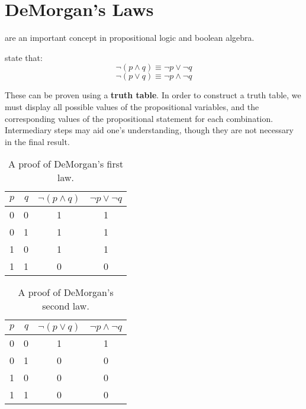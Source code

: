 \section{DeMorgan's Laws}
 are an important concept in propositional
logic and boolean algebra.

\begin{defn}
 state that:
\begin{equation}
  \neg (p \land q) \equiv \neg p \lor \neg q
\end{equation}
\begin{equation}
  \neg(p \lor q) \equiv \neg p \land \neg q
\end{equation}
\end{defn}
These can be proven using a \textbf{truth table}.
In order to construct a truth table, we must display all possible values of the propositional variables,
and the corresponding values of the propositional statement for each combination.
Intermediary steps may aid one's understanding, though they are not necessary in the final result.
\begin{table}[H]
  \centering
    \begin{tabular}{lrcc}
      \toprule
      $p$ & $q$ & $\neg(p \land q)$ & $\neg p \lor \neg q$ \\ \midrule
      0 & 0 & 1 & 1 \\
      0 & 1 & 1 & 1\\
      1 & 0 & 1 & 1\\
      1 & 1 & 0 & 0\\
      \bottomrule
    \end{tabular}
  \caption{A proof of DeMorgan's first law.}
\end{table}

\begin{table}[H]
  \centering
    \begin{tabular}{lrcc}
      \toprule
      $p$ & $q$ & $\neg(p \lor q)$ & $\neg p \land \neg q$ \\ \midrule
      0 & 0 & 1 & 1 \\
      0 & 1 & 0 & 0 \\
      1 & 0 & 0 & 0 \\
      1 & 1 & 0 & 0 \\
      \bottomrule
    \end{tabular}
  \caption{A proof of DeMorgan's second law.}
\end{table}

